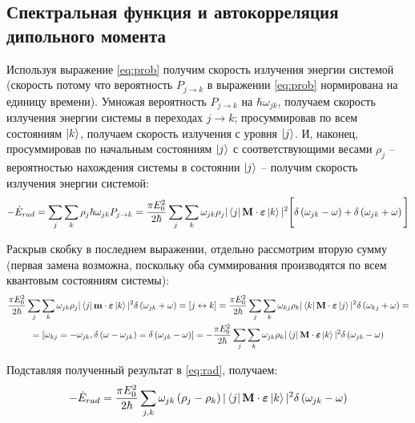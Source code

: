 \documentclass[12pt]{article}
\newcommand{\lb}{\left(}
\newcommand{\rb}{\right)}
\newcommand{\mf}{\mathbf}
\newcommand{\vverh}{\vspace*{-0.15cm}}
\begin{document}
\subsection*{Спектральная функция и автокорреляция дипольного момента}

Используя выражение \eqref{eq:prob} получим скорость излучения энергии системой (скорость потому что вероятность $P_{j \rightarrow k}$ в выражении \eqref{eq:prob} нормирована на единицу времени). Умножая вероятность $P_{j \rightarrow k}$ на $\hbar \omega_{jk}$, получаем скорость излучения энергии системы в переходах $j \rightarrow k$; просуммировав по всем состояниям $\ket{k}$, получаем скорость излучения с уровня $\ket{j}$. И, наконец, просуммировав по начальным состояниям $\ket{j}$ с соответствующими весами $\rho_j$ -- вероятностью нахождения системы в состоянии $\ket{j}$ -- получим скорость излучения энергии системой:
\vverh
\begin{gather}
	- \dot{E}_{rad} = \sum_j \sum_k \rho_j \hbar \omega_{jk} P_{j \rightarrow k} = \frac{\pi E_0^2}{2 \hbar} \sum_j \sum_k \omega_{jk} \rho_j | \bra{j} \mf{M} \cdot \boldsymbol{\varepsilon} \ket{k} |^2 \Bigg[ \delta \lb \omega_{jk} - \omega \rb + \delta \lb \omega_{jk} + \omega \rb \Bigg] \label{eq:rad}
\end{gather}

Раскрыв скобку в последнем выражении, отдельно рассмотрим вторую сумму (первая замена возможна, поскольку оба суммирования производятся по всем квантовым состояниям системы):
\vverh
\begin{gather}
	\frac{\pi E_0^2}{2 \hbar} \sum_j \sum_k \omega_{jk} \rho_j | \bra{j} \mf{m} \cdot \boldsymbol{\varepsilon} \ket{k} |^2 \delta \lb \omega_{jk} + \omega \rb = \left[ j \leftrightarrow k \right] = \frac{\pi E_0^2}{2 \hbar} \sum_j \sum_k \omega_{kj} \rho_k | \bra{k} \mf{M} \cdot \boldsymbol{\varepsilon} \ket{j} |^2 \delta \lb \omega_{kj} + \omega \rb = \notag \\
	= \left[ \omega_{kj} = - \omega_{jk}, \delta \lb \omega - \omega_{jk} \rb = \delta \lb \omega_{jk} - \omega \rb \right] = - \frac{\pi E_0^2}{2 \hbar} \sum_j \sum_k \omega_{jk} \rho_k | \bra{j} \mf{M} \cdot \boldsymbol{\varepsilon} \ket{k} |^2 \delta \lb \omega_{jk} - \omega \rb \notag
\end{gather}

Подставляя полученный результат в \eqref{eq:rad}, получаем:
\vverh
\begin{gather}
	- \dot{E}_{rad} = \frac{\pi E_0^2}{2 \hbar} \sum_{j, k} \omega_{jk} \lb \rho_j - \rho_k \rb | \bra{j} \mf{M} \cdot \boldsymbol{\varepsilon} \ket{k} |^2 \delta \lb \omega_{jk} - \omega \rb \notag 
\end{gather}
\end{document}
